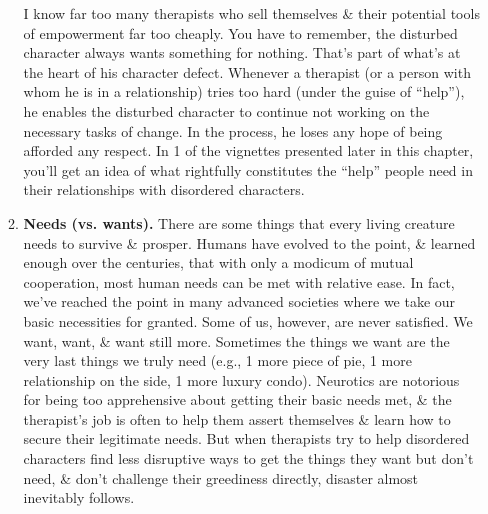 \documentclass{article}
\numberwithin{equation}{section}
\begin{document}
\begin{itemize}
\begin{enumerate}
		I know far too many therapists who sell themselves \& their potential tools of empowerment far too cheaply. You have to remember, the disturbed character always wants something for nothing. That's part of what's at the heart of his character defect. Whenever a therapist (or a person with whom he is in a relationship) tries too hard (under the guise of ``help''), he enables the disturbed character to continue not working on the necessary tasks of change. In the process, he loses any hope of being afforded any respect. In 1 of the vignettes presented later in this chapter, you'll get an idea of what rightfully constitutes the ``help'' people need in their relationships with disordered characters.
		\item \textbf{Needs (vs. wants).} There are some things that every living creature needs to survive \& prosper. Humans have evolved to the point, \& learned enough over the centuries, that with only a modicum of mutual cooperation, most human needs can be met with relative ease. In fact, we've reached the point in many advanced societies where we take our basic necessities for granted. Some of us, however, are never satisfied. We want, want, \& want still more. Sometimes the things we want are the very last things we truly need (e.g., 1 more piece of pie, 1 more relationship on the side, 1 more luxury condo). Neurotics are notorious for being too apprehensive about getting their basic needs met, \& the therapist's job is often to help them assert themselves \& learn how to secure their legitimate needs. But when therapists try to help disordered characters find less disruptive ways to get the things they want but don't need, \& don't challenge their greediness directly, disaster almost inevitably follows.
		

\end{enumerate}
\end{itemize}
\end{document}
